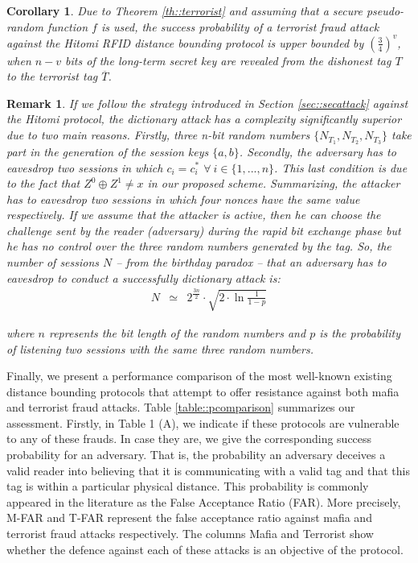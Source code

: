 \documentclass{article}
\newtheorem{corollary}{Corollary}
\newtheorem{remark}{Remark}
\begin{document}
\begin{corollary}
Due to Theorem \ref{th::terrorist} and assuming that a secure pseudo-random function $f$ is used, the success probability of a terrorist fraud attack against the Hitomi RFID distance bounding protocol is upper bounded by $(\frac{3}{4})^v$, when $n-v$ bits of the long-term secret key are revealed from the dishonest tag $T$ to the terrorist tag  $\overline{T}$.
\end{corollary}

\begin{remark}
If we follow the strategy introduced in Section \ref{sec::secattack} against the Hitomi protocol, the dictionary attack has a complexity significantly superior due to two main reasons. Firstly, three n-bit random numbers $\{N_{T_1}, N_{T_2}, N_{T_3}\}$ take part in the generation of the session keys $\{a, b\}$. Secondly, the adversary has to eavesdrop two sessions in which $c_i = c^{*}_i$ $\forall ~ i \in \{1,...,n\}$.  This last condition is due to the fact that $Z^{0} \oplus Z^{1} \neq x$ in our proposed scheme. Summarizing, the attacker has to eavesdrop two sessions in which four nonces have the same value respectively. If we assume that the attacker is active, then he can choose the challenge sent by the reader (adversary) during the rapid bit exchange phase  but he has no control over the three random numbers generated by the tag. So, the number of sessions $N$ -- from the birthday paradox -- that an adversary has to eavesdrop to conduct a successfully dictionary attack is:
\begin{eqnarray*}
N &\simeq& 2^{\frac{3n}{2}}\cdot \sqrt{2\cdot \ln \frac{1}{1-p}}
\end{eqnarray*}

where $n$ represents the bit length of the random numbers and $p$ is the probability of listening two sessions with the same three random numbers.

\end{remark}

Finally, we present a performance comparison of the most well-known existing distance bounding protocols that attempt to offer resistance against both mafia and terrorist fraud attacks.  Table \ref{table::pcomparison} summarizes our assessment. Firstly, in Table 1 (A), we indicate if these protocols are vulnerable to any of these frauds. In case they are, we give the corresponding success probability for an adversary. That is, the probability an adversary deceives a valid reader into believing that it is communicating with a valid tag and that this tag is within a particular physical distance.  This probability is commonly appeared in the literature as the False Acceptance Ratio (FAR). More precisely,  M-FAR and T-FAR represent the false acceptance ratio against mafia and terrorist fraud attacks respectively.  The columns Mafia and Terrorist show whether the defence against each of these attacks is an objective of the protocol.
\end{document}

